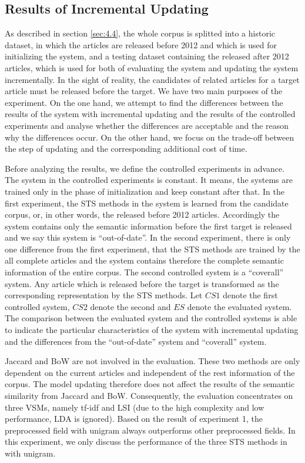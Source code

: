 \subsection{Results of Incremental Updating}
\label{sec:5.4}

As described in section \ref{sec:4.4}, the whole corpus is splitted into a historic dataset, in which the articles are released before 2012 and which is used for initializing the system, and a testing dataset containing the released after 2012 articles, which is used for both of evaluating the system and updating the system incrementally. In the sight of reality, the candidates of related articles for a target article must be released before the target. We have two main purposes of the experiment. On the one hand, we attempt to find the differences between the results of the system with incremental updating and the results of the controlled experiments and analyse whether the differences are acceptable and the reason why the differences occur. On the other hand, we focus on the trade-off between the step of updating and the corresponding additional cost of time. 

Before analyzing the results, we define the controlled experiments in advance. The system in the controlled experiments is constant. It means, the systems are trained only in the phase of initialization and keep constant after that. In the first experiment, the STS methods in the system is learned from the candidate corpus, or, in other words, the released before 2012 articles. Accordingly the system contains only the semantic information before the first target is released and we say this system is ``out-of-date''. In the second experiment, there is only one difference from the first experiment, that the STS methods are trained by the all complete articles and the system contains therefore the complete semantic information of the entire corpus. The second controlled system is a ``coverall'' system. Any article which is released before the target is transformed as the corresponding representation by the STS methods. Let $CS1$ denote the first controlled system, $CS2$ denote the second and $ES$ denote the evaluated system. The comparison between the evaluated system and the controlled systems is able to indicate the particular characteristics of the system with incremental updating and the differences from the ``out-of-date'' system and ``coverall'' system. 

Jaccard and BoW are not involved in the evaluation. These two methods are only dependent on the current articles and independent of the rest information of the corpus. The model updating therefore does not affect the results of the semantic similarity from Jaccard and BoW. Consequently, the evaluation concentrates on three VSMs, namely tf-idf and LSI (due to the high complexity and low performance, LDA is ignored). Based on the result of experiment 1, the preprocessed field \icontent{} with unigram always outperforms other preprocessed fields. In this experiment, we only discuss the performance of the three STS methods in \icontent{} with unigram. 

